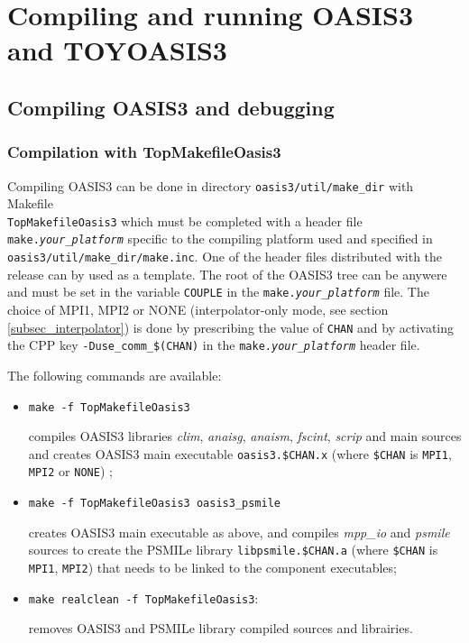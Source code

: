 \newpage
%

\chapter{Compiling and running OASIS3 and TOYOASIS3}
\label{sec_compilationrunning}

\section{Compiling OASIS3 and debugging}
\label{subsec_compile}



\subsection{Compilation with TopMakefileOasis3}
\label{sec_notSCE}

Compiling OASIS3 can be done in directory {\tt oasis3/util/make\_dir}
with Makefile \\ {\tt TopMakefileOasis3} which must be completed with a header file {\tt
  make.{\it your\_platform}} specific to the compiling platform used
and specified in {\tt oasis3/util/make\_dir/make.inc}.  One of the
header files distributed with the release can by used as a template.  The root of the OASIS3 tree
can be anywere and must be set in the variable {\tt COUPLE} in the
{\tt make.{\it your\_platform}} file. The choice of MPI1, MPI2 or NONE
(interpolator-only mode, see section \ref{subsec_interpolator}) is
done by prescribing the value of {\tt CHAN} and by activating the CPP key {\tt -Duse\_comm\_\$(CHAN)} in the {\tt make.{\it your\_platform}} header file.

The following commands are available:

\begin{itemize}
\item {\tt make -f TopMakefileOasis3} 

  compiles OASIS3 libraries {\it clim}, {\it anaisg}, {\it anaism},
  {\it fscint}, {\it scrip} and main sources and creates
  OASIS3 main executable {\tt oasis3.\$CHAN.x} (where {\tt \$CHAN} is
  {\tt MPI1}, {\tt MPI2} or {\tt NONE}) ;

\item {\tt make -f TopMakefileOasis3 oasis3\_psmile}

  creates OASIS3 main executable as above, and compiles {\it mpp\_io} and {\it
    psmile} sources to create the PSMILe library {\tt libpsmile.\$CHAN.a} (where {\tt \$CHAN} is
  {\tt MPI1}, {\tt MPI2}) that needs to be linked to the component executables;

\item {\tt make realclean -f  TopMakefileOasis3}: 

  removes OASIS3 and PSMILe library compiled sources and librairies.

\end{itemize}


